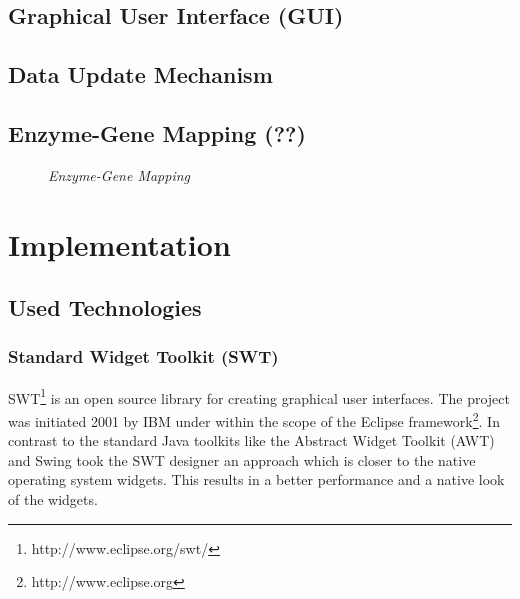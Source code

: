 

\section{Graphical User Interface (GUI)}

\section{Data Update Mechanism}


\section{Enzyme-Gene Mapping (??)}

\begin{figure}[ht]
\centering
{} 
\caption[Enzyme-Gene Mapping]{\textit{Enzyme-Gene Mapping}} 
\label{gfx:enzyme_gene_mapping}
\end{figure}

\chapter{Implementation}

\section{Used Technologies}
\subsection{Standard Widget Toolkit (SWT)}

SWT\footnote{http://www.eclipse.org/swt/} is an open source library for creating graphical user interfaces. The project was initiated 2001 by IBM under within the scope of the Eclipse framework\footnote{http://www.eclipse.org}. In contrast to the standard Java toolkits like the Abstract Widget Toolkit (AWT) and Swing took the SWT designer an approach which is closer to the native operating system widgets. This results in a better performance and a native look of the widgets.

